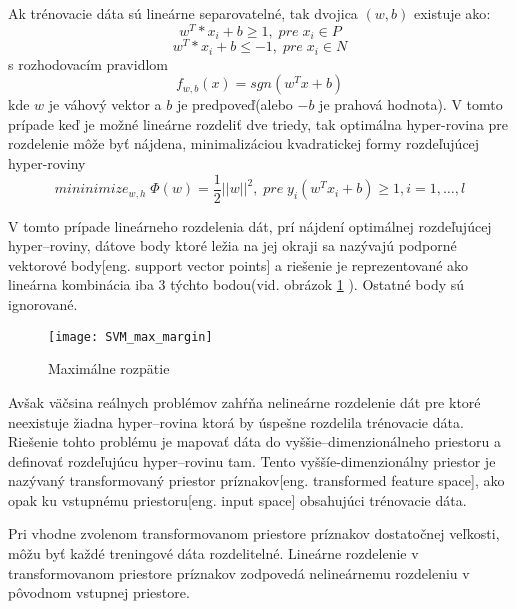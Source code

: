 Ak trénovacie dáta sú lineárne separovatelné, tak dvojica $(w, b)$ existuje ako\cite{prop:SupervisedMachineLearning}:
\begin{equation}
    \label{eq:SVMPair1}
    w^T * x_i + b \geq 1, \; pre \; x_i \in P
\end{equation}
\begin{equation}
    \label{eq:SVMPair2}
    w^T * x_i + b \leq -1, \; pre \; x_i \in N
\end{equation}
s rozhodovacím pravidlom
\begin{equation}
    \label{eq:SVMDecisionRule}
    f_{w,b}(x) = sgn(w^T x + b)
\end{equation}
kde $w$ je váhový vektor a $b$ je predpoveď(alebo $-b$ je prahová hodnota).
V tomto prípade keď je možné lineárne rozdeliť dve triedy, tak optimálna hyper-rovina pre rozdelenie
    môže byť nájdena, minimalizáciou kvadratickej formy rozdeľujúcej hyper-roviny
\begin{equation}
    \label{eq:SVMDecisionRule}
    mininimize_{w,h} \; \Phi(w) = \frac{1}{2}||w||^2, \; pre \; y_i(w^Tx_i + b) \geq 1, i = 1, \dots, l
\end{equation}

V tomto prípade lineárneho rozdelenia dát, prí nájdení optimálnej rozdeľujúcej hyper--roviny, dátove body ktoré ležia na jej okraji
    sa nazývajú podporné vektorové body[eng. support vector points] a riešenie je reprezentované ako lineárna kombinácia iba 3 týchto bodou(vid. obrázok \ref{pic:SVMMAxMargin} ).
Ostatné body sú ignorované\cite{prop:SupervisedMachineLearning}.

\begin{figure}[H]
	\centering
	\texttt{[image: SVM\_max\_margin]}
	\caption{Maximálne rozpätie\cite{prop:SupervisedMachineLearning}}
	\label{pic:SVMMAxMargin}
\end{figure}

Avšak väčsina reálnych problémov zahŕňa nelineárne rozdelenie dát pre ktoré neexistuje žiadna hyper--rovina ktorá by úspešne rozdelila trénovacie dáta.
Riešenie tohto problému je mapovať dáta do vyššie--dimenzionálneho priestoru a definovať rozdeľujúcu hyper--rovinu tam.
Tento vyššíe-dimenzionálny priestor je nazývaný transformovaný priestor príznakov[eng. transformed feature space], ako opak ku vstupnému priestoru[eng. input space] obsahujúci trénovacie dáta\cite{prop:SupervisedMachineLearning}.

Pri vhodne zvolenom transformovanom priestore príznakov dostatočnej veľkosti, môžu byť každé treningové dáta rozdelitelné.
Lineárne rozdelenie v transformovanom priestore príznakov zodpovedá nelineárnemu rozdeleniu v pôvodnom vstupnej priestore.

